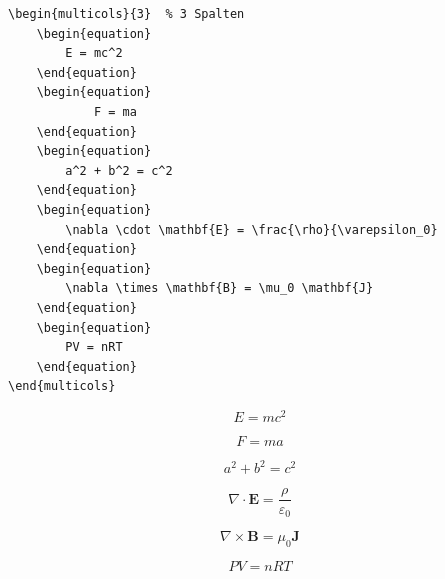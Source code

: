 \begin{lstlisting}[language={[LaTeX]TeX}, basicstyle=\small\ttfamily]
\begin{multicols}{3}  % 3 Spalten
    \begin{equation}
        E = mc^2
    \end{equation}
    \begin{equation}
            F = ma
    \end{equation}
    \begin{equation}
        a^2 + b^2 = c^2
    \end{equation}
    \begin{equation}
        \nabla \cdot \mathbf{E} = \frac{\rho}{\varepsilon_0}
    \end{equation}
    \begin{equation}
        \nabla \times \mathbf{B} = \mu_0 \mathbf{J}
    \end{equation}
    \begin{equation}
        PV = nRT
    \end{equation}
\end{multicols}
\end{lstlisting}

\begin{multicols}{3}  %
    \begin{equation}
        E = mc^2
    \end{equation}

    \begin{equation}
        F = ma
    \end{equation}

    \begin{equation}
        a^2 + b^2 = c^2
    \end{equation}

    \begin{equation}
        \nabla \cdot \mathbf{E} = \frac{\rho}{\varepsilon_0}
    \end{equation}

    \begin{equation}
        \nabla \times \mathbf{B} = \mu_0 \mathbf{J}
    \end{equation}

    \begin{equation}
        PV = nRT
    \end{equation}
\end{multicols}
